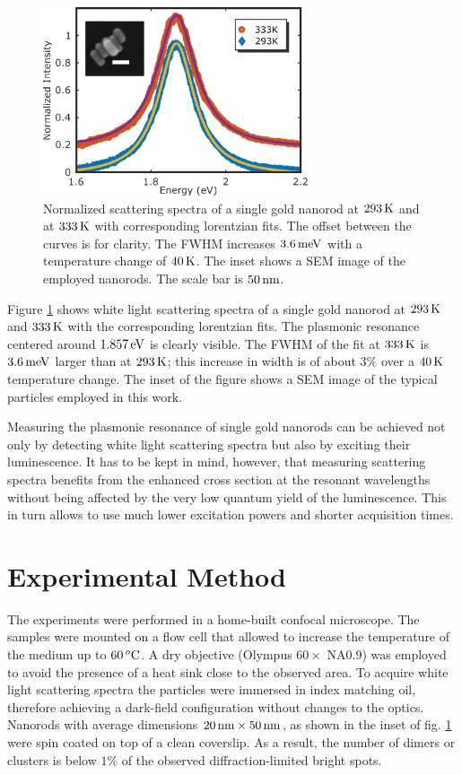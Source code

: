\begin{figure}[tp] \centering
\includegraphics[width=78mm]{Chapters/05_WhiteLight/Figures/01_Spectra_Example/01_Spectra_Example.png}
\caption{Normalized scattering spectra of a single gold nanorod at $293\,\textrm{K}$ and
at $333\,\textrm{K}$ with corresponding lorentzian fits. The offset between the curves is for
clarity. The FWHM increases $3.6\,\textrm{meV}$ with a temperature change of $40\,\textrm{K}$. The
inset shows a SEM image of the employed nanorods. The scale bar is $50\,\textrm{nm}$.}
	\label{fig:scattering_spectra}
\end{figure}

Figure \ref{fig:scattering_spectra} shows white light scattering spectra of a single
gold nanorod at $293\,\textrm{K}$ and $333\,\textrm{K}$ with the corresponding lorentzian fits. The
plasmonic resonance centered around $1.857\,\textrm{eV}$ is clearly visible. The FWHM of
the fit at $333\,\textrm{K}$ is $3.6\,\textrm{meV}$ larger than at $293\,\textrm{K}$; this increase in width
is of about $3\%$ over a $40\,\textrm{K}$ temperature change. The inset of the figure
shows a SEM image of the typical particles employed in this work.

Measuring the plasmonic resonance of single gold nanorods can be achieved not
only by detecting white light scattering spectra but also by exciting their
luminescence\cite{Konrad2013}. It has to be kept in mind, however, that
measuring scattering spectra benefits from the enhanced cross section at the
resonant wavelengths without being affected by the very low quantum yield of the
luminescence\cite{Yorulmaz2012}. This in turn allows to use much lower
excitation powers and shorter acquisition times.

\section{Experimental Method}

The experiments were performed in a home-built confocal microscope. The samples
were mounted on a flow cell that allowed to increase the temperature of the
medium up to $60\,^o\textrm{C}$. A dry objective (Olympus $60\times$ NA$0.9$) was
employed to avoid the presence of a heat sink close to the observed area. To
acquire white light scattering spectra the particles were immersed in index
matching oil, therefore achieving a dark-field configuration without changes to
the optics. Nanorods with average dimensions $20\,\textrm{nm}\times50\,\textrm{nm}$, as shown in the
inset of fig. \ref{fig:scattering_spectra} were spin coated on top of a clean
coverslip. As a result, the number of dimers or clusters is below $1\%$ of the
observed diffraction-limited bright spots.

